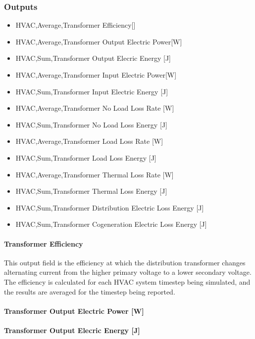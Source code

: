 \subsubsection{Outputs}\label{outputs-010}

\begin{itemize}
\item
  HVAC,Average,Transformer Efficiency{[]}
\item
  HVAC,Average,Transformer Output Electric Power{[}W{]}
\item
  HVAC,Sum,Transformer Output Elecric Energy {[}J{]}
\item
  HVAC,Average,Transformer Input Electric Power{[}W{]}
\item
  HVAC,Sum,Transformer Input Electric Energy {[}J{]}
\item
  HVAC,Average,Transformer No Load Loss Rate {[}W{]}
\item
  HVAC,Sum,Transformer No Load Loss Energy {[}J{]}
\item
  HVAC,Average,Transformer Load Loss Rate {[}W{]}
\item
  HVAC,Sum,Transformer Load Loss Energy {[}J{]}
\item
  HVAC,Average,Transformer Thermal Loss Rate {[}W{]}
\item
  HVAC,Sum,Transformer Thermal Loss Energy {[}J{]}
\item
  HVAC,Sum,Transformer Distribution Electric Loss Energy {[}J{]}
\item
  HVAC,Sum,Transformer Cogeneration Electric Loss Energy {[}J{]}
\end{itemize}

\paragraph{Transformer Efficiency}\label{transformer-efficiency}

This output field is the efficiency at which the distribution transformer changes alternating current from the higher primary voltage to a lower secondary voltage. The efficiency is calculated for each HVAC system timestep being simulated, and the results are averaged for the timestep being reported.

\paragraph{Transformer Output Electric Power {[}W{]}}\label{transformer-output-electric-power-w}

\paragraph{Transformer Output Elecric Energy {[}J{]}}\label{transformer-output-elecric-energy-j}

